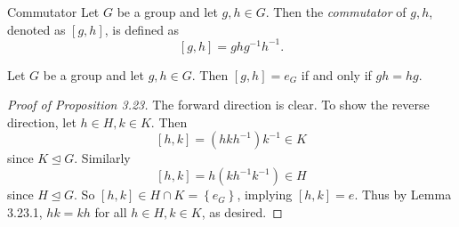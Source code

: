 \documentclass[pmath347]{subfiles}
\begin{document}
    \begin{definition}{Commutator}{}
        Let $G$ be a group and let $g,h\in G$. Then the \emph{commutator} of $g,h$, denoted as $\left[ g,h \right] $, is defined as
        \begin{equation*}
            \left[ g,h \right] = ghg^{-1} h^{-1} .
        \end{equation*}
    \end{definition}

    \begin{lemma_inside}{}
        Let $G$ be a group and let $g,h\in G$. Then $\left[ g,h \right] = e_G$ if and only if $gh=hg$.
    \end{lemma_inside}
    
    \begin{proof}[Proof of Proposition 3.23]
        The forward direction is clear. To show the reverse direction, let $h\in H, k\in K$. Then
        \begin{equation*}
            \left[ h,k \right] = \left( hkh^{-1}  \right) k^{-1} \in K
        \end{equation*}
        since $K\trianglelefteq G$. Similarly
        \begin{equation*}
            \left[ h,k \right] = h\left( kh^{-1} k^{-1}  \right) \in H
        \end{equation*}
        since $H\trianglelefteq G$. So $\left[ h,k \right] \in H\cap K = \left\lbrace e_G \right\rbrace$, implying $\left[ h,k \right] = e$. Thus by Lemma 3.23.1, $hk=kh$ for all $h\in H, k\in K$, as desired.
    \end{proof}
    
    
    
    
    
    
    
    
    
    
    
    
    
    
    
    
    
    
    
    
    
    
    
    
    
    
    
    
    
    
    
    
    
\end{document}
